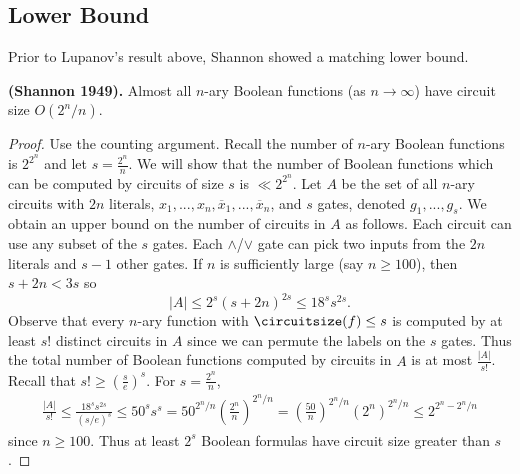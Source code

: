 	\subsection{Lower Bound}
	\label{ssec:circuitsizelowerbd}
	Prior to Lupanov's result above, Shannon showed a matching lower bound. 
	\begin{theorem}
		\label{thm:shannon1949-circuitsizelowerbd}
		\textbf{(Shannon 1949).} Almost all $n$-ary Boolean functions (as $n \rightarrow \infty$) have circuit size $O(2^n/n)$.
	\end{theorem}
	\begin{proof}
		Use the counting argument. Recall the number of $n$-ary Boolean functions is $2^{2^{n}}$ and let $s = \frac{2^n}{n}$. We will show that the number of Boolean functions which can be computed by circuits of size $s$ is $\ll 2^{2^{n}}$. Let $A$ be the set of all $n$-ary circuits with $2n$ literals, $x_1, ..., x_n, \overline{x}_1, ..., \overline{x}_n$, and $s$ gates, denoted $g_1, ..., g_s$. We obtain an upper bound on the number of circuits in $A$ as follows. Each circuit can use any subset of the $s$ gates. Each $\land$/$\lor$ gate can pick two inputs from the $2n$ literals and $s-1$ other gates. If $n$ is sufficiently large (say $n \geq 100$), then $s + 2n < 3s$ so
		\[|A| \leq 2^s(s + 2n)^{2s} \leq 18^ss^{2s}.\] 
		Observe that every $n$-ary function with $\circuitsize(f) \leq s$ is computed by at least $s!$ distinct circuits in $A$ since we can permute the labels on the $s$ gates. Thus the total number of Boolean functions computed by circuits in $A$ is at most $\frac{|A|}{s!}$. Recall that $s! \geq \left(\frac{s}{e}\right)^s$. For $s = \frac{2^n}{n}$,
		\begin{align*}
			\frac{|A|}{s!} \leq \frac{18^ss^{2s}}{\left(s/e\right)^s} \leq 50^s s^{s} = 50^{2^n/n}\left(\frac{2^n}{n}\right)^{2^{n}/n} = \left(\frac{50}{n}\right)^{2^n/n}\left(2^{n}\right)^{2^{n}/n} \leq 2^{2^n-2^n/n}
		\end{align*}
		since $n \geq 100$. Thus at least $2^{s}$ Boolean formulas have circuit size greater than $s$.
	\end{proof}